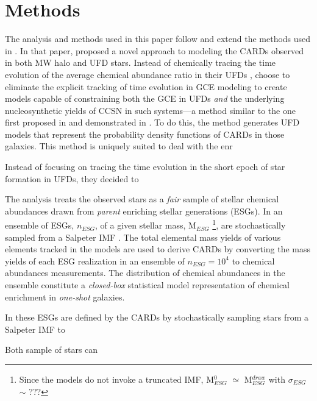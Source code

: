 \section{Methods}
\label{methods}

The analysis and methods used in this paper follow and extend the methods used in \citet{Lee_2013}. In that paper, \citet{Lee_2013} proposed a novel approach to modeling the CARDs observed in both MW halo and UFD stars. Instead of chemically tracing the time evolution of the average chemical abundance ratio in their UFDs \citep[see, e.g.,][i.e., a standard GCE modeling method]{Cohen_2010,???,???reviews}, \citet{Lee_2013} choose to eliminate the explicit tracking of time evolution in GCE modeling to create models capable of constraining both the GCE in UFDs {\it and} the underlying nucleosynthetic yields of CCSN in such systems---a method similar to the one first proposed in \citet{Karlsson2005a} and demonstrated in \citet{Karlsson_2005b}. To do this, the method generates UFD models that represent the probability density functions of CARDs in those galaxies. This method is uniquely suited to deal with the enr


Instead of focusing on tracing the time evolution in the short epoch of star formation in UFDs, they decided to 



The analysis treats the observed stars as a {\it fair} sample of stellar chemical abundances drawn from {\it parent} enriching stellar generations (ESGs). In \citet{Lee_2013} an ensemble of ESGs, $n_{ESG}$, of a given stellar mass, M$_{ESG}$
\footnote{Since the models do not invoke a truncated IMF, M$_{ESG}^0$ $\simeq$ M$_{ESG}^{draw}$ with $\sigma_{ESG}$ $\sim$ ???}, 
are stochastically sampled from a Salpeter IMF \citep{Salpeter_1955}. The total elemental mass yields of various elements tracked in the models are used to derive CARDs by converting the mass yields of each ESG realization in an ensemble of $n_{ESG} = 10^4$ to chemical abundances measurements. The distribution of chemical abundances in the ensemble constitute a {\it closed-box} statistical model representation of chemical enrichment in {\it one-shot} galaxies. 


In \citet{Lee_2013} these ESGs are defined by the CARDs by stochastically sampling stars from a Salpeter IMF \citep{Salpeter_1955} to    

Both sample of stars can 